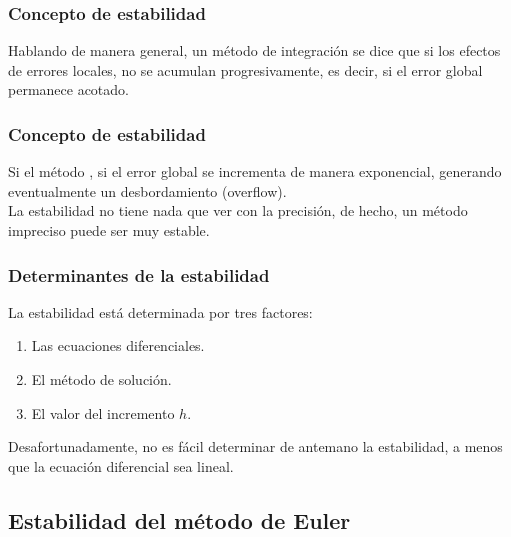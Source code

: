 \documentclass[12pt]{beamer}
\begin{document}
\begin{frame}
\frametitle{Concepto de estabilidad}
Hablando de manera general, un método de integración se dice que  si los efectos de errores locales, no se acumulan progresivamente, es decir, si el error global permanece acotado.
\end{frame}
\begin{frame}
\frametitle{Concepto de estabilidad}
Si el método , si el error global se incrementa de manera exponencial, generando eventualmente un desbordamiento (overflow).
\\
\bigskip
\pause
La estabilidad no tiene nada que ver con la precisión, de hecho, un método impreciso puede ser muy estable.
\end{frame}
\begin{frame}
\frametitle{Determinantes de la estabilidad}
La estabilidad está determinada por tres factores:
\pause
{}
\begin{enumerate}[<+->]
\item Las ecuaciones diferenciales.
\item El método de solución.
\item El valor del incremento $h$.
\end{enumerate}
\pause
Desafortunadamente, no es fácil determinar de antemano la estabilidad, a menos que la ecuación diferencial sea lineal.
\end{frame}

\subsection{Estabilidad del método de Euler}
\end{document}
